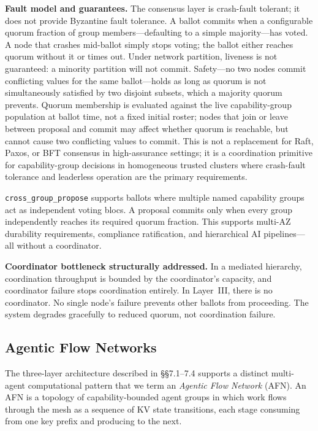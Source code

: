 \documentclass[11pt]{article}
\begin{document}
\textbf{Fault model and guarantees.} The consensus layer is crash-fault tolerant;
it does not provide Byzantine fault tolerance. A ballot commits when a configurable
quorum fraction of group members---defaulting to a simple majority---has voted. A
node that crashes mid-ballot simply stops voting; the ballot either reaches quorum
without it or times out. Under network partition, liveness is not guaranteed: a
minority partition will not commit. Safety---no two nodes commit conflicting values
for the same ballot---holds as long as quorum is not simultaneously satisfied by
two disjoint subsets, which a majority quorum prevents. Quorum membership is
evaluated against the live capability-group population at ballot time, not a fixed
initial roster; nodes that join or leave between proposal and commit may affect
whether quorum is reachable, but cannot cause two conflicting values to commit.
This is not a replacement for Raft, Paxos, or BFT consensus in high-assurance
settings; it is a coordination primitive for capability-group decisions in
homogeneous trusted clusters where crash-fault tolerance and leaderless operation
are the primary requirements.

\texttt{cross\_group\_propose} supports ballots where multiple named capability
groups act as independent voting blocs. A proposal commits only when every group
independently reaches its required quorum fraction. This supports multi-AZ
durability requirements, compliance ratification, and hierarchical AI pipelines---all
without a coordinator.

\textbf{Coordinator bottleneck structurally addressed.} In a mediated hierarchy,
coordination throughput is bounded by the coordinator's capacity, and coordinator
failure stops coordination entirely. In Layer~III, there is no coordinator. No
single node's failure prevents other ballots from proceeding. The system degrades
gracefully to reduced quorum, not coordination failure.

\subsection{Agentic Flow Networks}

The three-layer architecture described in \S\S7.1--7.4 supports a distinct
multi-agent computational pattern that we term an \emph{Agentic Flow Network}
(AFN). An AFN is a topology of capability-bounded agent groups in which work flows
through the mesh as a sequence of KV state transitions, each stage consuming from
one key prefix and producing to the next.
\end{document}
